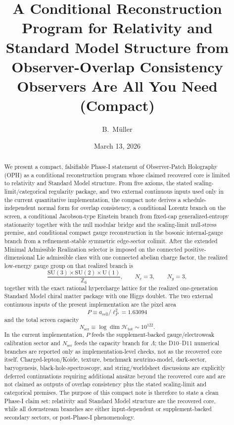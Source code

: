 \documentclass[11pt]{article}
\title{A Conditional Reconstruction Program for Relativity and Standard Model Structure from\\
Observer-Overlap Consistency\\[0.4em]
\large Observers Are All You Need (Compact)}
\author{B.\ M\"uller}
\date{March 13, 2026}
\newcommand{\SU}{\mathrm{SU}}
\newcommand{\U}{\mathrm{U}}
\begin{document}
\maketitle
\OPHPaperReleaseBanner

\begin{abstract}
We present a compact, falsifiable Phase-I statement of Observer-Patch Holography (OPH) as a conditional reconstruction program whose claimed recovered core is limited to relativity and Standard Model structure. From five axioms, the stated scaling-limit/categorical regularity package, and two external continuous inputs used only in the current quantitative implementation, the compact note derives a schedule-independent normal form for overlap consistency, a conditional Lorentz branch on the screen, a conditional Jacobson-type Einstein branch from fixed-cap generalized-entropy stationarity together with the null modular bridge and the scaling-limit null-stress premise, and conditional compact gauge reconstruction in the bosonic internal-gauge branch from a refinement-stable symmetric edge-sector colimit. After the extended Minimal Admissible Realization selector is imposed on the connected positive-dimensional Lie admissible class with one connected abelian charge factor, the realized low-energy gauge group on that realized branch is
\[
\frac{\SU(3)\times \SU(2)\times \U(1)}{\mathbb Z_6},
\qquad
N_c=3,
\qquad
N_g=3,
\]
together with the exact rational hypercharge lattice for the realized one-generation Standard Model chiral matter package with one Higgs doublet. The two external continuous inputs of the present implementation are the pixel area
\[
P \equiv a_{\mathrm{cell}}/\ell_P^2 = 1.63094
\]
and the total screen capacity
\[
N_{\mathrm{scr}} \equiv \log \dim \mathcal H_{\mathrm{tot}} \sim 10^{122}.
\]
In the current implementation, $P$ feeds the supplement-backed gauge/electroweak calibration sector and $N_{\mathrm{scr}}$ feeds the capacity branch for $\Lambda$; the D10--D11 numerical branches are reported only as implementation-level checks, not as the recovered core itself. Charged-lepton/Koide, texture, benchmark neutrino-model, dark-sector, baryogenesis, black-hole-spectroscopy, and string/worldsheet discussions are explicitly deferred continuations requiring additional ans\"atze beyond the recovered core and are not claimed as outputs of overlap consistency plus the stated scaling-limit and categorical premises. The purpose of this compact note is therefore to state a clean Phase-I claim set: relativity and Standard Model structure are the recovered core, while all downstream branches are either input-dependent or supplement-backed secondary sectors, or post-Phase-I phenomenology.
\end{abstract}
\end{document}
